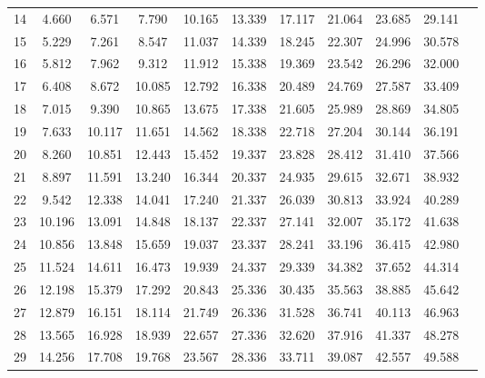 \begin{tabular}{|g|c|c|c|c|c|c|c|c|c|c|}
    14                & 4.660   & 6.571   & 7.790   & 10.165  & 13.339  & 17.117   & 21.064   & 23.685   & 29.141   \\
    15                & 5.229   & 7.261   & 8.547   & 11.037  & 14.339  & 18.245   & 22.307   & 24.996   & 30.578   \\
    16                & 5.812   & 7.962   & 9.312   & 11.912  & 15.338  & 19.369   & 23.542   & 26.296   & 32.000   \\
    17                & 6.408   & 8.672   & 10.085  & 12.792  & 16.338  & 20.489   & 24.769   & 27.587   & 33.409   \\
    18                & 7.015   & 9.390   & 10.865  & 13.675  & 17.338  & 21.605   & 25.989   & 28.869   & 34.805   \\
    19                & 7.633   & 10.117  & 11.651  & 14.562  & 18.338  & 22.718   & 27.204   & 30.144   & 36.191   \\
    20                & 8.260   & 10.851  & 12.443  & 15.452  & 19.337  & 23.828   & 28.412   & 31.410   & 37.566   \\
    21                & 8.897   & 11.591  & 13.240  & 16.344  & 20.337  & 24.935   & 29.615   & 32.671   & 38.932   \\
    22                & 9.542   & 12.338  & 14.041  & 17.240  & 21.337  & 26.039   & 30.813   & 33.924   & 40.289   \\
    23                & 10.196  & 13.091  & 14.848  & 18.137  & 22.337  & 27.141   & 32.007   & 35.172   & 41.638   \\
    24                & 10.856  & 13.848  & 15.659  & 19.037  & 23.337  & 28.241   & 33.196   & 36.415   & 42.980   \\
    25                & 11.524  & 14.611  & 16.473  & 19.939  & 24.337  & 29.339   & 34.382   & 37.652   & 44.314   \\
    26                & 12.198  & 15.379  & 17.292  & 20.843  & 25.336  & 30.435   & 35.563   & 38.885   & 45.642   \\
    27                & 12.879  & 16.151  & 18.114  & 21.749  & 26.336  & 31.528   & 36.741   & 40.113   & 46.963   \\
    28                & 13.565  & 16.928  & 18.939  & 22.657  & 27.336  & 32.620   & 37.916   & 41.337   & 48.278   \\
    29                & 14.256  & 17.708  & 19.768  & 23.567  & 28.336  & 33.711   & 39.087   & 42.557   & 49.588   \\

\end{tabular}
